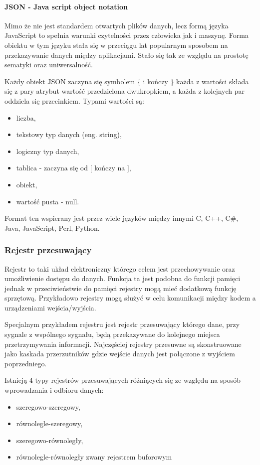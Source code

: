 \documentclass[a4paper,12pt]{article}
\begin{document}
\paragraph{JSON -  Java script object notation}

Mimo że nie jest standardem otwartych plików danych, lecz formą języka JavaScript to spełnia warunki czytelności przez człowieka jak i maszynę. 
Forma obiektu w tym języku stała się w przeciągu lat popularnym sposobem na przekazywanie danych między aplikacjami. Stało się tak ze względu na prostotę sematyki oraz uniwersalność. 

Każdy obiekt JSON zaczyna się symbolem \{ i kończy \} każda z wartości składa się z pary atrybut wartość przedzielona dwukropkiem, a każda z kolejnych par oddziela się przecinkiem. Typami wartości są:
\begin{itemize}
        \item liczba, 
        \item tekstowy typ danych (eng. string),
        \item logiczny typ danych,
        \item tablica - zaczyna się od [ kończy na ],
        \item obiekt,
        \item wartość pusta - null. 
\end{itemize}

Format ten wspierany jest przez wiele języków między innymi C, C++, C\#, Java, JavaScript, Perl, Python\cite{json}.

\subsubsection{Rejestr przesuwający}
Rejestr to taki układ elektroniczny którego celem jest przechowywanie oraz umożliwienie dostępu do danych. Funkcja ta jest podobna do funkcji pamięci jednak w przeciwieństwie do pamięci rejestry mogą mieć dodatkową funkcję sprzętową.
Przykładowo rejestry mogą służyć w celu komunikacji między kodem a urządzeniami wejścia/wyjścia.

Specjalnym przykładem rejestru jest rejestr przesuwający którego dane, przy sygnale z wspólnego sygnału, będą przekazywane do kolejnego miejsca przetrzymywania informacji. 
Najczęściej rejestry przesuwne są skonstruowane jako kaskada przerzutników gdzie wejście danych jest połączone z wyjściem poprzedniego.

Istnieją 4 typy rejestrów przesuwających różniących się ze względu na sposób wprowadzania i odbioru danych:
\begin{itemize}
        \item szeregowo-szeregowy,
        \item równolegle-szeregowy,
        \item szeregowo-równoległy,
        \item równolegle-równoległy zwany rejestrem buforowym  
\end{itemize} 
\end{document}
